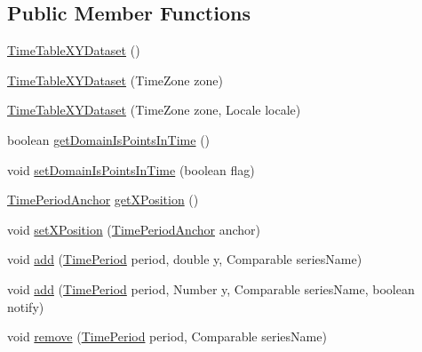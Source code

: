 \subsection*{Public Member Functions}
\begin{DoxyCompactItemize}
\item 
\mbox{\hyperlink{classorg_1_1jfree_1_1data_1_1time_1_1_time_table_x_y_dataset_a967fe56fe4fba5c470ca8def8b2caa1d}{Time\+Table\+X\+Y\+Dataset}} ()
\item 
\mbox{\hyperlink{classorg_1_1jfree_1_1data_1_1time_1_1_time_table_x_y_dataset_a3ae4c21fb7446543e3fbaace14bca742}{Time\+Table\+X\+Y\+Dataset}} (Time\+Zone zone)
\item 
\mbox{\hyperlink{classorg_1_1jfree_1_1data_1_1time_1_1_time_table_x_y_dataset_a9190c04d22595afa416bba6e05a29804}{Time\+Table\+X\+Y\+Dataset}} (Time\+Zone zone, Locale locale)
\item 
boolean \mbox{\hyperlink{classorg_1_1jfree_1_1data_1_1time_1_1_time_table_x_y_dataset_a2fee635aed27d459cef92926f96cbe37}{get\+Domain\+Is\+Points\+In\+Time}} ()
\item 
void \mbox{\hyperlink{classorg_1_1jfree_1_1data_1_1time_1_1_time_table_x_y_dataset_a3dfd1e08223b07236245bed2739011ac}{set\+Domain\+Is\+Points\+In\+Time}} (boolean flag)
\item 
\mbox{\hyperlink{classorg_1_1jfree_1_1data_1_1time_1_1_time_period_anchor}{Time\+Period\+Anchor}} \mbox{\hyperlink{classorg_1_1jfree_1_1data_1_1time_1_1_time_table_x_y_dataset_a8346f001c677400629be5c93775dfeb8}{get\+X\+Position}} ()
\item 
void \mbox{\hyperlink{classorg_1_1jfree_1_1data_1_1time_1_1_time_table_x_y_dataset_a337c2e5697dc824c58215035b441d338}{set\+X\+Position}} (\mbox{\hyperlink{classorg_1_1jfree_1_1data_1_1time_1_1_time_period_anchor}{Time\+Period\+Anchor}} anchor)
\item 
void \mbox{\hyperlink{classorg_1_1jfree_1_1data_1_1time_1_1_time_table_x_y_dataset_a61e4bdaac4e5b2bb7164fbf313cbc26a}{add}} (\mbox{\hyperlink{interfaceorg_1_1jfree_1_1data_1_1time_1_1_time_period}{Time\+Period}} period, double y, Comparable series\+Name)
\item 
void \mbox{\hyperlink{classorg_1_1jfree_1_1data_1_1time_1_1_time_table_x_y_dataset_abf0f48e8cdffef9281bbba488e6bd1fd}{add}} (\mbox{\hyperlink{interfaceorg_1_1jfree_1_1data_1_1time_1_1_time_period}{Time\+Period}} period, Number y, Comparable series\+Name, boolean notify)
\item 
void \mbox{\hyperlink{classorg_1_1jfree_1_1data_1_1time_1_1_time_table_x_y_dataset_a6b46443bd273fa361e8b15a8f86413a0}{remove}} (\mbox{\hyperlink{interfaceorg_1_1jfree_1_1data_1_1time_1_1_time_period}{Time\+Period}} period, Comparable series\+Name)

\end{DoxyCompactItemize}
